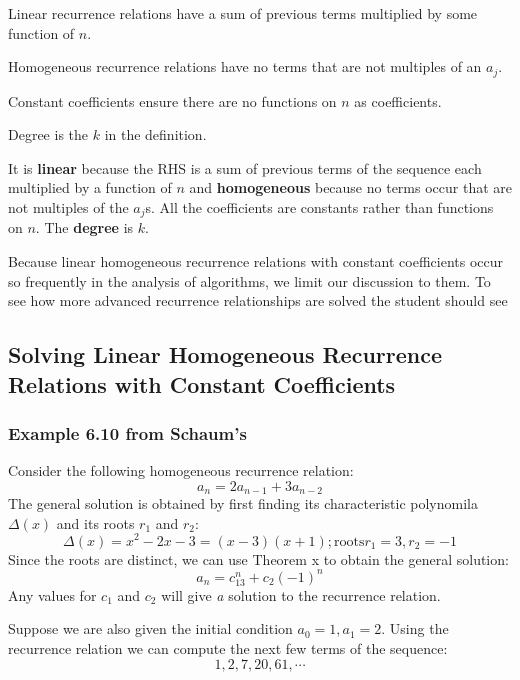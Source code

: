 Linear recurrence relations have a sum of previous terms multiplied by some function of $n$.

Homogeneous recurrence relations have no terms that are not multiples of an $a_j$.

Constant coefficients ensure there are no functions on $n$ as coefficients.

Degree is the $k$ in the definition.


    It is \textbf{linear} because the RHS is a sum of previous terms of the sequence each multiplied by a function of $n$ and \textbf{homogeneous} because no terms occur that are not multiples of the $a_j$s. All the coefficients are constants rather than functions on $n$. The \textbf{degree} is $k$. 

Because linear homogeneous recurrence relations with constant coefficients occur so frequently in the analysis of algorithms, we limit our discussion to them. To see how more advanced recurrence relationships are solved the student should see                                                           

  \subsection {Solving Linear Homogeneous Recurrence Relations with Constant Coefficients}
  
  \subsubsection{Example 6.10 from Schaum's}
  Consider the following homogeneous recurrence relation:
  \begin{displaymath}
  a_n=2a_{n-1}+3a_{n-2}
  \end{displaymath}
  The general solution is obtained by first finding its characteristic polynomila $\Delta(x)$ and its roots $r_1$ and $r_2$:
  \begin{displaymath}
  \Delta(x)=x^2-2x-3=(x-3)(x+1); \text{roots} r_1=3, r_2=-1
  \end{displaymath}
  Since the roots are distinct, we can use Theorem x to obtain the general solution:
  \begin{displaymath}
   a_n=c_13^n+c_2(-1)^n
  \end{displaymath}
  Any values for $c_1$ and $c_2$ will give \textit{a} solution to the recurrence relation.
  
  Suppose we are also given the initial condition $a_0=1,a_1=2$. Using the recurrence relation we can compute the next few terms of the sequence:
\begin{displaymath}
  1,2,7,20,61,\cdots
  \end{displaymath}
  
